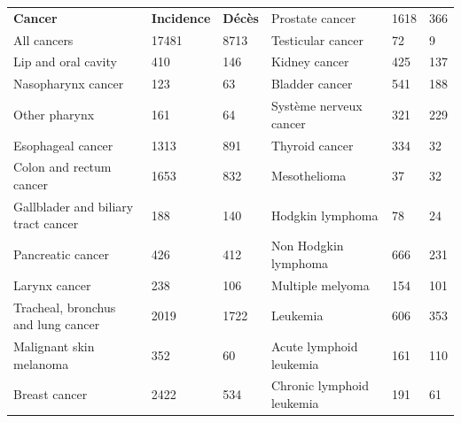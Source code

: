 \begin{table}[H]
    \begin{tabular}{lll|lll}
    \textbf{Cancer}                     & \textbf{Incidence}& \textbf{Décès}& Prostate cancer                  & 1618               & 366           \\
    All cancers                         & 17481             & 8713          &  Testicular cancer               & 72                 & 9             \\
    Lip and oral cavity                 & 410               & 146           &  Kidney cancer                   & 425                & 137           \\
    Nasopharynx cancer                  & 123               & 63            &  Bladder cancer                  & 541                & 188           \\
    Other pharynx                       & 161               & 64            &  Système nerveux cancer          & 321                & 229           \\
    Esophageal cancer                   & 1313              & 891           &  Thyroid cancer                  & 334                & 32            \\
    Colon and rectum cancer             & 1653              & 832           &  Mesothelioma                    & 37                 & 32            \\
    Gallblader and biliary tract cancer & 188               & 140           &  Hodgkin lymphoma                & 78                 & 24            \\
    Pancreatic cancer                   & 426               & 412           &  Non Hodgkin lymphoma            & 666                & 231           \\
    Larynx cancer                       & 238               & 106           &  Multiple melyoma                & 154                & 101           \\
    Tracheal, bronchus and lung cancer  & 2019              & 1722          &  Leukemia                        & 606                & 353           \\
    Malignant skin melanoma             & 352               & 60            &  Acute lymphoid leukemia         & 161                & 110           \\
    Breast cancer                       & 2422              & 534           &  Chronic lymphoid leukemia       & 191                & 61            \\

\end{tabular}
\end{table}
